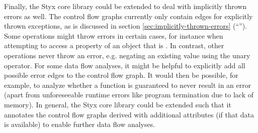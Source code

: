 Finally, the Styx core library could be extended to deal with implicitly thrown errors as well. The control flow graphs currently only contain edges for explicitly thrown exceptions, as is discussed in section \ref{sec:implicitly-thrown-errors} (``''). Some operations might throw errors in certain cases, for instance when attempting to access a property of an object that is . In contrast, other operations never throw an error, e.g. negating an existing value using the unary \code{!} operator. For some data flow analyses, it might be helpful to explicitly add all possible error edges to the control flow graph. It would then be possible, for example, to analyze whether a function is guaranteed to never result in an error (apart from unforeseeable runtime errors like program termination due to lack of memory). In general, the Styx core library could be extended such that it annotates the control flow graphs derived with additional attributes (if that data is available) to enable further data flow analyses.

